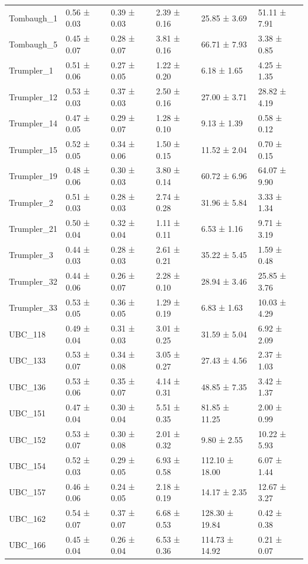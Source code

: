 \begin{tabular}{llllll}
Tombaugh_1 & 0.56 ± 0.03 & 0.39 ± 0.03 & 2.39 ± 0.16 & 25.85 ± 3.69 & 51.11 ± 7.91 \\
Tombaugh_5 & 0.45 ± 0.07 & 0.28 ± 0.07 & 3.81 ± 0.16 & 66.71 ± 7.93 & 3.38 ± 0.85 \\
Trumpler_1 & 0.51 ± 0.06 & 0.27 ± 0.05 & 1.22 ± 0.20 & 6.18 ± 1.65 & 4.25 ± 1.35 \\
Trumpler_12 & 0.53 ± 0.03 & 0.37 ± 0.03 & 2.50 ± 0.16 & 27.00 ± 3.71 & 28.82 ± 4.19 \\
Trumpler_14 & 0.47 ± 0.05 & 0.29 ± 0.07 & 1.28 ± 0.10 & 9.13 ± 1.39 & 0.58 ± 0.12 \\
Trumpler_15 & 0.52 ± 0.05 & 0.34 ± 0.06 & 1.50 ± 0.15 & 11.52 ± 2.04 & 0.70 ± 0.15 \\
Trumpler_19 & 0.48 ± 0.06 & 0.30 ± 0.03 & 3.80 ± 0.14 & 60.72 ± 6.96 & 64.07 ± 9.90 \\
Trumpler_2 & 0.51 ± 0.03 & 0.28 ± 0.03 & 2.74 ± 0.28 & 31.96 ± 5.84 & 3.33 ± 1.34 \\
Trumpler_21 & 0.50 ± 0.04 & 0.32 ± 0.04 & 1.11 ± 0.11 & 6.53 ± 1.16 & 9.71 ± 3.19 \\
Trumpler_3 & 0.44 ± 0.03 & 0.28 ± 0.03 & 2.61 ± 0.21 & 35.22 ± 5.45 & 1.59 ± 0.48 \\
Trumpler_32 & 0.44 ± 0.06 & 0.26 ± 0.07 & 2.28 ± 0.10 & 28.94 ± 3.46 & 25.85 ± 3.76 \\
Trumpler_33 & 0.53 ± 0.05 & 0.36 ± 0.05 & 1.29 ± 0.19 & 6.83 ± 1.63 & 10.03 ± 4.29 \\
UBC_118 & 0.49 ± 0.04 & 0.31 ± 0.03 & 3.01 ± 0.25 & 31.59 ± 5.04 & 6.92 ± 2.09 \\
UBC_133 & 0.53 ± 0.07 & 0.34 ± 0.08 & 3.05 ± 0.27 & 27.43 ± 4.56 & 2.37 ± 1.03 \\
UBC_136 & 0.53 ± 0.06 & 0.35 ± 0.07 & 4.14 ± 0.31 & 48.85 ± 7.35 & 3.42 ± 1.37 \\
UBC_151 & 0.47 ± 0.04 & 0.30 ± 0.04 & 5.51 ± 0.35 & 81.85 ± 11.25 & 2.00 ± 0.99 \\
UBC_152 & 0.53 ± 0.07 & 0.30 ± 0.08 & 2.01 ± 0.32 & 9.80 ± 2.55 & 10.22 ± 5.93 \\
UBC_154 & 0.52 ± 0.03 & 0.29 ± 0.05 & 6.93 ± 0.58 & 112.10 ± 18.00 & 6.07 ± 1.44 \\
UBC_157 & 0.46 ± 0.06 & 0.24 ± 0.05 & 2.18 ± 0.19 & 14.17 ± 2.35 & 12.67 ± 3.27 \\
UBC_162 & 0.54 ± 0.07 & 0.37 ± 0.07 & 6.68 ± 0.53 & 128.30 ± 19.84 & 0.42 ± 0.38 \\
UBC_166 & 0.45 ± 0.04 & 0.26 ± 0.04 & 6.53 ± 0.36 & 114.73 ± 14.92 & 0.21 ± 0.07 \\

\end{tabular}
